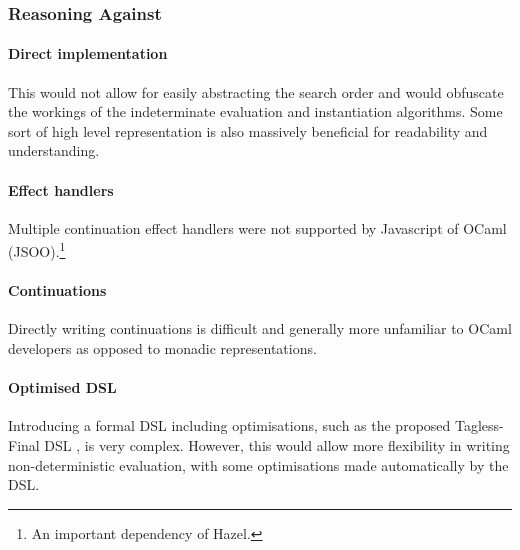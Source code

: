 \subsubsection{Reasoning Against}
\paragraph{Direct implementation} This would not allow for easily abstracting the search order and would obfuscate the workings of the indeterminate evaluation and instantiation algorithms. Some sort of high level representation is also massively beneficial for readability and understanding.
\paragraph{Effect handlers} Multiple continuation effect handlers were not supported by Javascript of OCaml (JSOO).\footnote{An important dependency of Hazel.} 
\paragraph{Continuations} Directly writing continuations is difficult and generally more unfamiliar to OCaml developers as opposed to monadic representations.
\paragraph{Optimised DSL} Introducing a formal DSL including optimisations, such as the proposed Tagless-Final DSL \cite{TaglessFinalDSL, NondetDSL}, is very complex. However, this would allow more flexibility in writing non-deterministic evaluation, with some optimisations made automatically by the DSL.